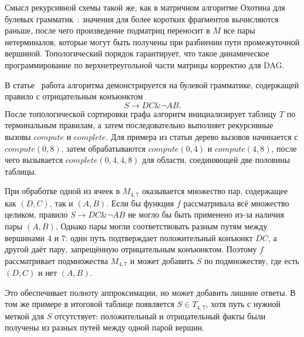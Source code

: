 Смысл рекурсивной схемы такой же, как в матричном алгоритме Охотина для булевых грамматик~: значения для более коротких фрагментов вычисляются раньше, после чего произведение подматриц переносит в $M$ все пары нетерминалов, которые могут быть получены при разбиении пути промежуточной вершиной. Топологический порядок гарантирует, что такое динамическое программирование по верхнетреугольной части матрицы корректно для DAG.

\begin{example}
    В статье~ работа алгоритма демонстрируется на булевой грамматике, содержащей правило с отрицательным конъюнктом
    \[
        S \rightarrow DC \& \neg AB.
    \]
    После топологической сортировки графа алгоритм инициализирует таблицу $T$ по терминальным правилам, а затем последовательно выполняет рекурсивные вызовы $compute$ и $complete$. Для примера из статьи дерево вызовов начинается с $compute(0,8)$, затем обрабатываются $compute(0,4)$ и $compute(4,8)$, после чего вызывается $complete(0,4,4,8)$ для области, соединяющей две половины таблицы.


    При обработке одной из ячеек в $M_{4,7}$ оказывается множество пар, содержащее как $(D,C)$, так и $(A,B)$. Если бы функция $f$ рассматривала всё множество целиком, правило $S \rightarrow DC \& \neg AB$ не могло бы быть применено из-за наличия пары $(A,B)$. Однако пары могли соответствовать разным путям между вершинами $4$ и $7$: один путь подтверждает положительный конъюнкт $DC$, а другой даёт пару, запрещённую отрицательным конъюнктом. Поэтому $f$ рассматривает подмножества $M_{4,7}$ и может добавить $S$ по подмножеству, где есть $(D,C)$ и нет $(A,B)$.

    Это обеспечивает полноту аппроксимации, но может добавить лишние ответы. В том же примере в итоговой таблице появляется $S \in T_{4,7}$, хотя путь с нужной меткой для $S$ отсутствует: положительный и отрицательный факты были получены из разных путей между одной парой вершин.

\end{example}


